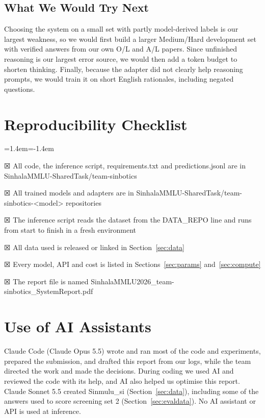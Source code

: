 \documentclass[11pt]{article}
\newcommand{\ticked}{{\symbolfont ☒}}
\newcommand{\sinmulu}{Sinmulu\_si}
\begin{document}
\subsection{What We Would Try Next}
Choosing the system on a small set with partly model-derived labels is our largest weakness, so we would first build a larger Medium/Hard development set with verified answers from our own O/L and A/L papers. Since unfinished reasoning is our largest error source, we would then add a token budget to shorten thinking. Finally, because the adapter did not clearly help reasoning prompts, we would train it on short English rationales, including negated questions.

\section{Reproducibility Checklist}\label{sec:reproduction}
\begin{list}{}{\leftmargin=1.4em\itemindent=-1.4em\itemsep=2pt\parsep=0pt\topsep=2pt}\raggedright
\item \ticked{} All code, the inference script, requirements.txt and predictions.jsonl are in SinhalaMMLU-SharedTask/team-sinbotics
\item \ticked{} All trained models and adapters are in SinhalaMMLU-SharedTask/team-sinbotics-<model> repositories
\item \ticked{} The inference script reads the dataset from the DATA\_REPO line and runs from start to finish in a fresh environment
\item \ticked{} All data used is released or linked in Section~\ref{sec:data}
\item \ticked{} Every model, API and cost is listed in Sections~\ref{sec:params} and~\ref{sec:compute}
\item \ticked{} The report file is named SinhalaMMLU2026\_team-sinbotics\_SystemReport.pdf
\end{list}

\smallskip
\section{Use of AI Assistants}
Claude Code (Claude Opus 5.5) wrote and ran most of the code and experiments, prepared the submission, and drafted this report from our logs, while the team directed the work and made the decisions. During coding we used AI and reviewed the code with its help, and AI also helped us optimise this report. Claude Sonnet 5.5 created \sinmulu{} (Section~\ref{sec:data}), including some of the answers used to score screening set 2 (Section~\ref{sec:evaldata}). No AI assistant or API is used at inference.
\end{document}
